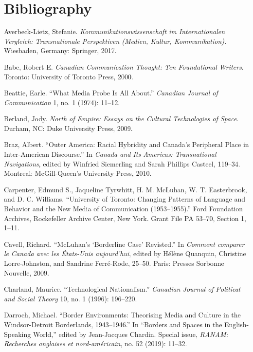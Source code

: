 \documentclass{tufte-handout}
\begin{document}
\section{Bibliography}\label{bibliography}

\begin{hangparas}{.25in}{1} 



Averbeck-Lietz, Stefanie. \emph{Kommunikationswissenschaft im
Internationalen Vergleich: Transnationale Perspektiven (Medien, Kultur,
Kommunikation).} Wiesbaden, Germany: Springer, 2017.

Babe, Robert E. \emph{Canadian Communication Thought: Ten Foundational
Writers}. Toronto: University of Toronto Press, 2000.

Beattie, Earle. ``What Media Probe Is All About.'' \emph{Canadian
Journal of Communication} 1, no. 1 (1974): 11--12.

Berland, Jody. \emph{North of Empire: Essays on the Cultural
Technologies of Space}. Durham, NC: Duke University Press, 2009.

Braz, Albert. ``Outer America: Racial Hybridity and Canada's Peripheral
Place in Inter-American Discourse.'' In \emph{Canada and Its Americas:
Transnational Navigations}, edited by Winfried Siemerling and Sarah
Phillips Casteel\emph{,} 119--34. Montreal: McGill-Queen's University
Press, 2010.

Carpenter, Edmund S., Jaqueline Tyrwhitt, H. M. McLuhan, W. T.
Easterbrook, and D. C. Williams. ``University of Toronto: Changing
Patterns of Language and Behavior and the New Media of Communication
(1953--1955).'' Ford Foundation Archives, Rockefeller Archive Center,
New York. Grant File PA 53--70, Section 1, 1--11.

Cavell, Richard. ``McLuhan's `Borderline Case' Revisted.'' In
\emph{Comment comparer le Canada avec les États-Unis aujourd'hui},
edited by Hélène Quanquin, Christine Lorre-Johnston, and Sandrine
Ferré-Rode, 25--50. Paris: Presses Sorbonne Nouvelle, 2009.

Charland, Maurice. ``Technological Nationalism.'' \emph{Canadian Journal
of Political and Social Theory} 10, no. 1 (1996): 196--220.

Darroch, Michael. ``Border Environments: Theorising Media and Culture in
the Windsor-Detroit Borderlands, 1943--1946.'' In ``Borders and Spaces
in the English-Speaking World,'' edited by Jean-Jacques Chardin. Special
issue, \emph{RANAM: Recherches anglaises et nord-américain}, no. 52
(2019): 11--32.


\end{hangparas}
\end{document}
